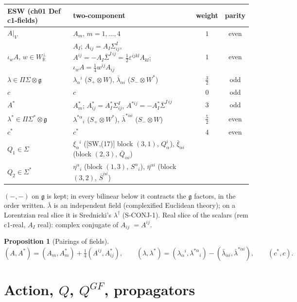 \documentclass[11pt]{article}
\theoremstyle{definition}
\newtheorem{proposition}[definition]{Proposition}
\begin{document}
\begin{center}\small
\begin{tabular}{l|l|c|c}
ESW (ch01 Def c1-fields) & two-component & weight & parity \\
\hline
$A|_V$ & $A_m$, $m=1,\dots,4$ & $1$ & even \\
$\iota_wA$, $w\in W_{\mathbb R}^\perp$ & $A_I$; $A_{ij}=A_I\Sigma^I_{ij}$, $A^{ij}=-A_I\bar\Sigma^{I\,ij}=\tfrac12\varepsilon^{ijkl}A_{kl}$; $\iota_wA=\tfrac14w^{ij}A_{ij}$ & $1$ & even \\
$\lambda\in\Pi\Sigma\otimes\mathfrak g$ & $\lambda_\alpha{}^i$ ($S_+\otimes W$), $\bar\lambda_{\dot\alpha i}$ ($S_-\otimes W^*$) & $\tfrac32$ & odd \\
$c$ & $c$ & $0$ & odd \\
$A^*$ & $A^*_m$; $A^*_{ij}=A^*_I\Sigma^I_{ij}$, $A^{*ij}=-A^*_I\bar\Sigma^{I\,ij}$ & $3$ & odd \\
$\lambda^*\in\Pi\Sigma^*\otimes\mathfrak g$ & $\lambda^{*\alpha}{}_i$ ($S_+\otimes W^*$), $\bar\lambda^{*\dot\alpha i}$ ($S_-\otimes W$) & $\tfrac52$ & even \\
$c^*$ & $c^*$ & $4$ & even \\
$Q_1\in\Sigma$ & $\xi_\alpha{}^i$ ([SW,(17)] block $(3,1)$, $Q^i_\alpha$), $\bar\xi_{\dot\alpha i}$ (block $(2,3)$, $\bar Q_{\dot\alpha i}$) & & \\
$Q_2\in\Sigma^*$ & $\eta^\alpha{}_i$ (block $(1,3)$, $S^\alpha{}_i$), $\bar\eta^{\dot\alpha i}$ (block $(3,2)$, $\bar S^{\dot\alpha i}$) & & \\
\end{tabular}
\end{center}

$(-,-)$ on $\mathfrak g$ is kept; in every bilinear below it contracts the $\mathfrak g$ factors, in the order written. $\bar\lambda$ is an independent field (complexified Euclidean theory); on a Lorentzian real slice it is Srednicki's $\lambda^\dagger$ (S-CONJ-1). Real slice of the scalars (rem c1-real, $A_I$ real): complex conjugate of $A_{ij}$ $=A^{ij}$.

\begin{proposition}[Pairings of fields]\label{prop:pair}
\[
(A,A^*)=(A_m,A^*_m)+\tfrac14(A^{ij},A^*_{ij}),\qquad (\lambda,\lambda^*)=(\lambda_\alpha{}^i,\lambda^{*\alpha}{}_i)-(\bar\lambda_{\dot\alpha i},\bar\lambda^{*\dot\alpha i}),\qquad (c^*,c).
\]
\end{proposition}

\section{Action, $Q$, $Q^{GF}$, propagators}
\end{document}
